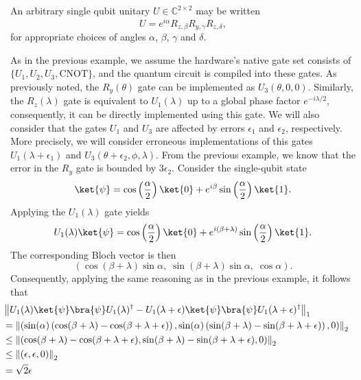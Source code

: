 \begin{example}
An arbitrary single qubit unitary $U \in \mathbb{C}^{2 \times 2}$ may be written
\[
U = e^{i\alpha} R_{z,\beta} R_{y,\gamma} R_{z,\delta},
\]
for appropriate choices of angles $\alpha$, $\beta$, $\gamma$ and $\delta$.


As in the previous example, we assume the hardware's native gate set consists of $\{U_1, U_2, U_3, \text{CNOT}\}$, and the quantum circuit is compiled into these gates.  
As previously noted, the $R_y(\theta)$ gate can be implemented as $U_3(\theta, 0, 0)$.  
Similarly, the $R_z(\lambda)$ gate is equivalent to $U_1(\lambda)$ up to a global phase factor $e^{-i\lambda/2}$, consequently, it can be directly implemented using this gate.  
We will also consider that the gates $U_1$ and $U_3$ are affected by errors $\epsilon_1$ and $\epsilon_2$, respectively. 
More precisely, we will consider erroneous implementations of this gates $U_1(\lambda + \epsilon_1)$ and $U_3(\theta + \epsilon_2, \phi, \lambda)$. 
From the previous example, we know that the error in the $R_y$ gate is bounded by $3 \epsilon_2$. 
Consider the single-qubit state
\[
\ket{\psi} = \cos\left(\frac{\alpha}{2}\right)\ket{0} + e^{i\beta}\sin\left(\frac{\alpha}{2}\right)\ket{1}.
\]
Applying the \( U_1(\lambda) \) gate yields
\[
U_1(\lambda)\ket{\psi} = \cos\left(\frac{\alpha}{2}\right)\ket{0} + e^{i(\beta + \lambda)}\sin\left(\frac{\alpha}{2}\right)\ket{1}.
\]
The corresponding Bloch vector is then
\[
\left(\!\cos(\beta + \lambda)\sin\alpha,\; \sin(\beta + \lambda)\sin\alpha,\; \cos\alpha\right).
\]
Consequently, applying the same reasoning as in the previous example, it follows that
\begin{align*}
  & \hspace{-15pt} \tracenorm{U_1(\lambda) \ket{\psi}\bra{\psi} U_1(\lambda)^\dag - U_1(\lambda + \epsilon) \ket{\psi}\bra{\psi}U_1(\lambda + \epsilon)^\dag } \\
  & \hspace{-15pt} = \euclideannorm{\left(\sin(\alpha) \left( \cos(\beta + \lambda) -  \cos(\beta + \lambda + \epsilon) \right),\sin(\alpha) \left( \sin(\beta + \lambda) -  \sin(\beta + \lambda + \epsilon) \right),0 \right)} \\
  & \hspace{-15pt}\leq \euclideannorm{\left( \cos(\beta + \lambda) -  \cos(\beta + \lambda + \epsilon) , \sin(\beta + \lambda) -  \sin(\beta + \lambda + \epsilon) ,0 \right)} \\
  & \hspace{-15pt} \leq \euclideannorm{\left( \epsilon, \epsilon ,0 \right)} \\
  & \hspace{-15pt} = \sqrt{2}\epsilon \\
\end{align*} 


\end{example}
